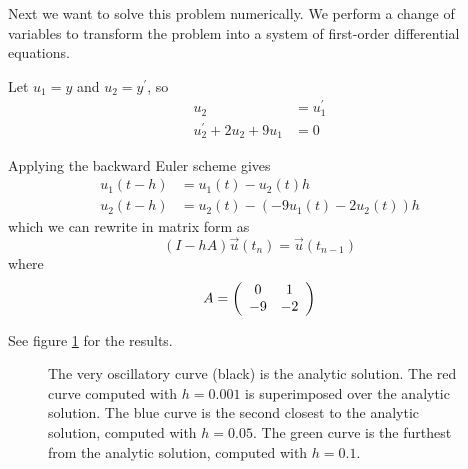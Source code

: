 \documentclass[11pt,letterpaper]{article}
\begin{document}
Next we want to solve this problem numerically.
We perform a change of variables to transform the problem into a system of
first-order differential equations.

Let $u_1 = y$ and $u_2 = y^\prime$, so
%
\begin{align*}
  u_2 &= u_1^\prime \\
  u_2^\prime + 2u_2 + 9 u_1 &= 0
\end{align*}

Applying the backward Euler scheme gives
%
\begin{align*}
  u_1(t - h) &= u_1(t) - u_2(t) h \\
  u_2(t - h) &= u_2(t) - (- 9 u_1(t) - 2 u_2(t))h
\end{align*}
%
which we can rewrite in matrix form as
%
\begin{equation*}
  (I - h A) \vec u(t_n) = \vec u(t_{n-1})
\end{equation*}
%
where
\begin{equation*}
  A = \left(
    \begin{array}{cc}
      0 & 1 \\
      -9 & -2
    \end{array}
  \right)
\end{equation*}

See figure \ref{fig:q4} for the results.

\begin{figure}[ht]
  \centering
  \caption{%
    The very oscillatory curve (black) is the analytic solution.
    The red curve computed with $h = 0.001$ is superimposed over the analytic
    solution.
    The blue curve is the second closest to the analytic solution,
    computed with $h = 0.05$.
    The green curve is the furthest from the analytic solution,
    computed with $h = 0.1$.
  }
  \label{fig:q4}
\end{figure}
\end{document}
